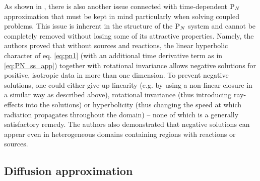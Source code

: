 As shown in \cite{McClarren4}, there is also another issue connected with time-dependent $\text{P}_{N}$ approximation that must
be kept in mind particularly when solving coupled problems. This issue is inherent in the structure of the $\text{P}_{N}$ system
and cannot be completely removed without losing some of its attractive properties. Namely, the authors proved that
without sources and reactions, the linear hyperbolic character of eq. \eqref{eq:pn1} (with an additional time derivative
term as in \eqref{eq:PN_ss_app}) together with rotational invariance allows negative solutions for positive, isotropic
data in more than one dimension. To prevent negative solutions, one could either give-up linearity (e.g. by using a
non-linear closure in a similar way as described above), rotational invariance (thus introducing ray-effects into the solutions) or
hyperbolicity (thus changing the speed at which radiation propagates throughout the domain) -- none of which is a
generally satisfactory remedy. The authors also demonstrated that negative solutions can appear even in heterogeneous
domains containing regions with reactions or sources.



\subsection{Diffusion approximation}\label{sec:diffusion}

